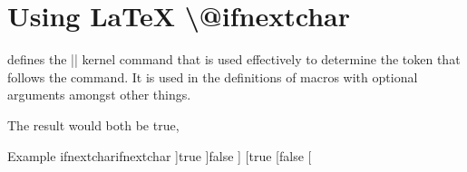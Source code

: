 \begin{comment}
\def\elidebefore[#1]#2{[$\ldots$] #2}
\def\elideafter#1{#1$\ldots$}

\def\elide {%
\futurelet\ifoptions
    \choosemacro
}



\def\choosemacro{%
 \ifx\ifoptions [%
     \let\choice = \elidebefore 
 \else
    \let\choice = \elideafter
 \fi
\choice
}

Testing \elide[b]{Lorem ipsum}

\elide{Lorem Ipsum}

\elide[b]{Lorem ipsum}

\end{comment}


\section{Using LaTeX \protect\textbackslash @ifnextchar}

\latex defines the |\@ifnextchar| kernel command that is used effectively to
determine the token that follows the command. It is used in the definitions
of macros with optional arguments amongst other things.

\begin{teXXX}
\@ifnextchar]{true}{false}] 
 ] %
\@ifnextchar[{true [}{false} [ %
\makeatother
\end{texexample}





















